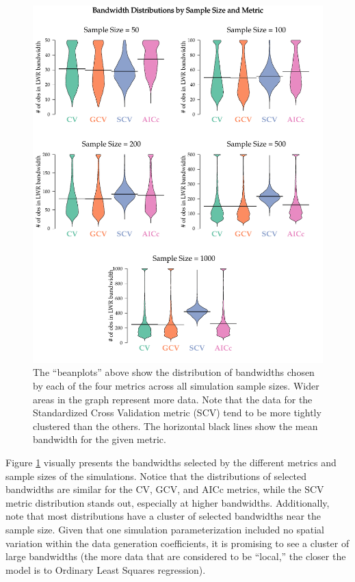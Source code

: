 \documentclass{article}\usepackage{graphicx, color}
\begin{document}
\begin{figure}
\includegraphics{figure/beanplots.pdf}
\caption{The ``beanplots'' above show the distribution of bandwidths chosen by each of the four metrics across all simulation sample sizes. Wider areas in the graph represent more data. Note that the data for the Standardized Cross Validation metric (SCV) tend to be more tightly clustered than the others. The horizontal black lines show the mean bandwidth for the given metric.}
\label{fig:beanplots}
\end{figure}

Figure \ref{fig:beanplots} visually presents the bandwidths selected by the different metrics and sample sizes of the simulations. Notice that the distributions of selected bandwidths are similar for the CV, GCV, and AICc metrics, while the SCV metric distribution stands out, especially at higher bandwidths. Additionally, note that most distributions have a cluster of selected bandwidths near the sample size. Given that one simulation parameterization included no spatial variation within the data generation coefficients, it is promising to see a cluster of large bandwidths (the more data that are considered to be ``local,'' the closer the model is to Ordinary Least Squares regression). 
\end{document}

